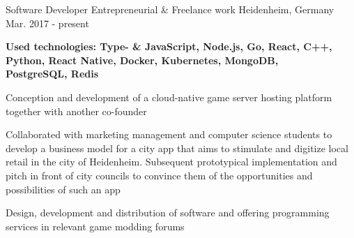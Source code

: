 \begin{cventries}

  \cventry
    {Software Developer} %
    {\faUser{} Entrepreneurial \& Freelance work} %
    {Heidenheim, Germany} %
    {Mar. 2017 - present} %
    {
      \begin{cvitems} %
        {\scriptsize\textbf{Used technologies: Type- \& JavaScript, Node.js, Go, React, C++, Python, React Native, Docker, Kubernetes, MongoDB,\\ PostgreSQL, Redis}}
        \item {}
        \item {Conception and development of a cloud-native game server hosting platform together with another co-founder}
        \item {Collaborated with marketing management and computer science students to develop a business model for a city app that aims to stimulate and digitize local retail in the city of Heidenheim. Subsequent prototypical implementation and pitch in front of city councils to convince them of the opportunities and possibilities of such an app}
        \item {Design, development and distribution of software and offering programming services in relevant game modding forums}
      \end{cvitems}
    }

\end{cventries}
